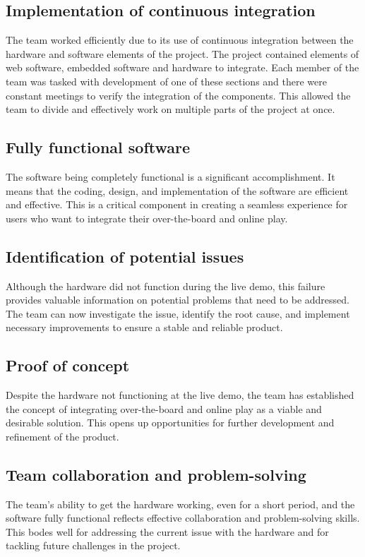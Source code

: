 \documentclass{article}
\begin{document}
\subsection{Implementation of continuous integration} 
The team worked efficiently due to its use of continuous integration between the hardware and
software elements of the project. The project contained elements of web software, embedded 
software and hardware to integrate. Each member of the team was tasked with development of one 
of these sections and there were constant meetings to verify the integration of the components. 
This allowed the team to divide and effectively work on multiple parts of the project at once.

\subsection{Fully functional software}
The software being completely functional is a significant accomplishment. It means that the coding, design, and implementation of the software are efficient and effective. This is a critical component in creating a seamless experience for users who want to integrate their over-the-board and online play.

\subsection{Identification of potential issues}
Although the hardware did not function during the live demo, this failure provides valuable information on potential problems that need to be addressed. The team can now investigate the issue, identify the root cause, and implement necessary improvements to ensure a stable and reliable product.

\subsection{Proof of concept}
Despite the hardware not functioning at the live demo, the team has established the concept of integrating over-the-board and online play as a viable and desirable solution. This opens up opportunities for further development and refinement of the product.

\subsection{Team collaboration and problem-solving}
The team's ability to get the hardware working, even for a short period, and the software fully functional reflects effective collaboration and problem-solving skills. This bodes well for addressing the current issue with the hardware and for tackling future challenges in the project.
\end{document}
